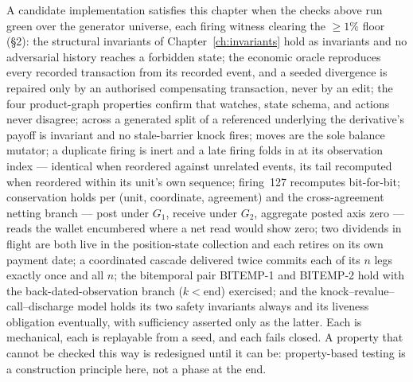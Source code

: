 A candidate implementation satisfies this chapter when the checks above run green over the
generator universe, each firing witness clearing the $\ge 1\%$ floor (\S 2): the structural
invariants of Chapter~\ref{ch:invariants} hold as
invariants and no adversarial history reaches a forbidden state; the economic oracle
reproduces every recorded transaction from its recorded event, and a seeded divergence is
repaired only by an authorised compensating transaction, never by an edit; the four product-graph properties confirm that
watches, state schema, and actions never disagree; across a generated split of a referenced
underlying the derivative's payoff is invariant and no stale-barrier knock fires; moves are the
sole balance mutator; a duplicate firing is inert and a late firing folds in at its observation
index --- identical when reordered against unrelated events, its tail recomputed when reordered
within its unit's own sequence; firing~127 recomputes bit-for-bit; conservation holds per (unit,
coordinate, agreement) and the cross-agreement netting branch --- post under $G_1$, receive
under $G_2$, aggregate posted axis zero --- reads the wallet encumbered where a net read would
show zero; two dividends in flight are both live in the position-state collection and each
retires on its own payment date; a coordinated cascade delivered twice commits each of its $n$
legs exactly once and all $n$; the bitemporal pair BITEMP-1 and BITEMP-2 hold with the
back-dated-observation branch ($k<\text{end}$) exercised; and the
knock--revalue--call--discharge model holds its two safety invariants
always and its liveness obligation eventually, with sufficiency asserted only as the latter.
Each is mechanical, each is replayable from a seed, and each fails closed. A property that
cannot be checked this way is redesigned until it can be: property-based testing is a
construction principle here, not a phase at the end.

